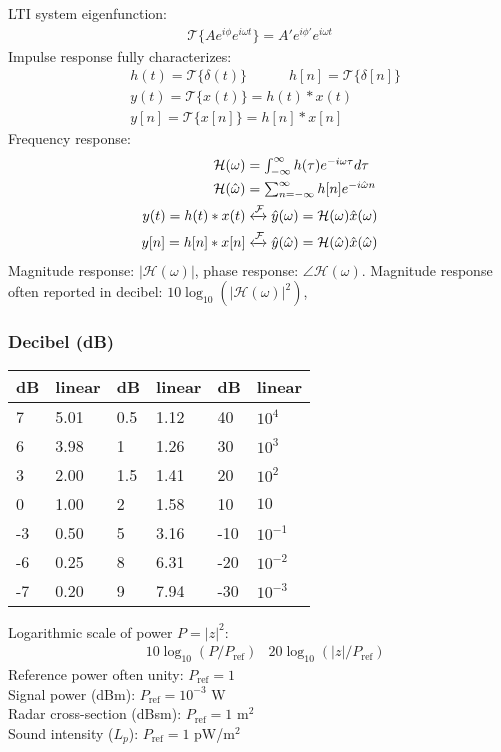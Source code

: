 \documentclass[6pt,landscape,a4paper]{article}
\begin{document}
\begin{multicols*}{5}
LTI system eigenfunction:
\vspace{-0.5em}
\begin{align*}
\mathcal{T}\{A e^{i\phi} e^{i\omega t}\}=A' e^{i\phi'}e^{i\omega t}
\end{align*}
Impulse response fully characterizes:
\vspace{-0.5em}
\begin{align*}
&h(t) = \mathcal{T}\{\delta(t)\} \hspace{3em} h[n]  = \mathcal{T}\{\delta[n]\} \\
&y(t) = \mathcal{T}\{x(t)\} = h(t)*x(t) \\
&y[n]  = \mathcal{T}\{x[n]\} = h[n]*x[n]
\end{align*}
Frequency response:
\vspace{-1em}
\begin{align*}
  \mathcal{H}(\omega) &= \textstyle\int_{-\infty}^{\infty} h(\tau) e^{-i \omega \tau} d\tau \\
    \mathcal{H}(\hat{\omega}) &= \textstyle\sum_{n=-\infty}^{\infty} h[n] e^{-i \hat{\omega} n} \\
        y(t) = h(t)*x(t) &\xleftrightarrow{\mathcal{F}} \hat{y}(\omega)=\mathcal{H}(\omega)\hat{x}(\omega) \\
     y[n] = h[n]*x[n] &\xleftrightarrow{\mathcal{F}} \hat{y}(\hat{\omega})=\mathcal{H}(\hat{\omega})\hat{x}(\hat{\omega}) 
\end{align*}
Magnitude response: $|\mathcal{H}(\omega)|$, phase response: $\angle \mathcal{H}(\omega)$. Magnitude response often reported in decibel: $10\log_{10}(|\mathcal{H}(\omega)|^2)$,

\subsubsection*{Decibel (dB)}
\begin{tabularx}{\columnwidth}{ll|ll|ll}
dB & linear & dB & linear & dB & linear \\
\hline
7  & 5.01 & 0.5 & 1.12 & 40 & $10^{4}$ \\
6  & 3.98 & 1 & 1.26 & 30 & $10^{3}$ \\
3  & 2.00 &  1.5 & 1.41 & 20 &$10^{2}$  \\
0  & 1.00 & 2 & 1.58 & 10 &  $10$\\
-3  & 0.50 & 5 & 3.16 & -10 & $10^{-1}$ \\
-6  & 0.25 & 8 & 6.31 & -20 & $10^{-2}$ \\
-7  & 0.20 & 9 & 7.94 & -30 & $10^{-3}$ \\
\end{tabularx}
Logarithmic scale of power $P=|z|^2$:
\begin{align*}
 &10 \log_{10}(P/P_{\mathrm{ref}})
 &20 \log_{10}(|z|/P_{\mathrm{ref}})
\end{align*}
Reference power often unity: $P_{\mathrm{ref}}=1$\\
Signal power (dBm): $P_{\mathrm{ref}}=10^{-3}$ W\\
Radar cross-section (dBsm): $P_{\mathrm{ref}}=1$ m$^{2}$\\
Sound intensity ($L_p$): $P_{\mathrm{ref}}=1$ pW/m$^{2}$ 

\end{multicols*}
\end{document}
